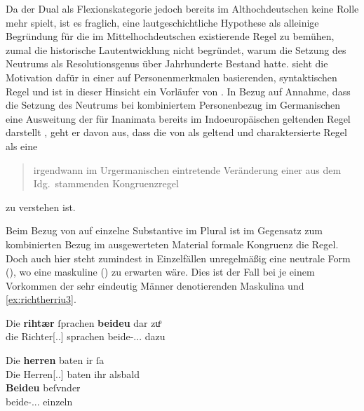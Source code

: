 Da der Dual als Flexionskategorie jedoch bereits im Althochdeutschen keine
Rolle mehr spielt, ist es fraglich, eine lautgeschichtliche Hypothese als
alleinige Begründung für die im Mittel\-hoch\-deutschen existierende Regel zu
bemühen, zumal die historische Lautentwicklung nicht begründet, warum die
Setzung des Neutrums als Resolutionsgenus über Jahrhunderte Bestand hatte.
\citet{askedal1973} sieht die Motivation dafür in einer auf Personenmerkmalen
basierenden, syntaktischen Regel und ist in dieser Hinsicht ein Vorläufer von
\citet{corbett1983,wechslerzlatic2003}. In Bezug auf
 Annahme, dass die Setzung des Neutrums bei
kombiniertem Personenbezug im Germanischen eine Ausweitung der für Inanimata
bereits im Indoeuropäischen geltenden Regel darstellt
\autocite[vgl.~auch][156--157]{hock2008}, geht er davon aus, dass die von
\textcites[28]{behaghel1928}[188]{dal2014} als 
geltend und  charaktersierte Regel als eine
\blockcquote[15]{askedal1973}{irgendwann im Urgermanischen
eintretende\textdel{} Veränderung einer aus dem Idg.\ stammenden
Kongruenzregel} zu verstehen ist.

Beim Bezug von  auf einzelne Substantive im Plural ist im
Gegensatz zum kombinierten Bezug im ausgewerteten Material formale Kongruenz
die Regel. Doch auch hier steht zumindest in Einzelfällen unregelmäßig eine
neutrale Form (), wo eine maskuline () zu erwarten
wäre. Dies ist der Fall bei je einem Vorkommen der sehr eindeutig Männer
denotierenden Maskulina   und 
 \cref{ex:richtherriu3}.

\begin{exe}
\ex \label{ex:richtherriu3}
	\begin{xlist}
	\ex \gll Die \textbf{rihtær} ſprachen \textbf{beideu} {dar zuͦ} \\
			die Richter[\Nom.\Pl.\MascM] sprachen beide-\Nom.\Pl.\NeutM.\St{}
			dazu \\
		\begin{taggedline}{\parencites[\pno~28\ra, 8]{kc:B1}[vgl.~abweichend][10090]{schroeder1895}} %
		\trans {}
		\end{taggedline}
		\label{ex:richtherriu3_1}

	\ex \gll Die \textbf{herren} baten ir ſa \\
			Die Herren[\Nom.\Pl.\MascM] baten ihr alsbald \\
	\sn \gll \textbf{Beideu} beſvnder \\
			beide-\Nom.\Pl.\NeutM.\St{} einzeln \\
		\begin{taggedline}{\parencites[\pno~31\va, 48--49]{kc:B1}[vgl.][11385--11386]{schroeder1895}} %
		\trans {}
		\end{taggedline}
		\label{ex:richtherriu3_2}
	\end{xlist}
\end{exe}

